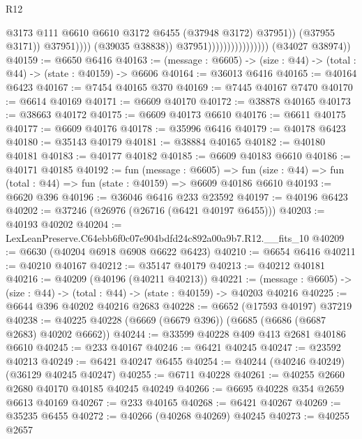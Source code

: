 \begin{lexlean}{R12}
\begin{coremodule}
                                                      @3173
                                                      @111
                                                      @6610
                                                      @6610
                                                      @3172
                                                      @6455
                                                      (@37948 @3172)
                                                      @37951))
                                                  (@37955 @3171))
                                                @37951))))
                                        (@39035 @38838))
                                      @37951))))))))))))))))
      (@34027 @38974))
@40159 := @6650 @6416
@40163 := (message : @6605) -> (size : @44) -> (total : @44) -> (state : @40159) -> @6606
@40164 := @36013 @6416
@40165 := @40164 @6423
@40167 := @7454 @40165 @370
@40169 := @7445 @40167 @7470
@40170 := @6614 @40169
@40171 := @6609 @40170
@40172 := @38878 @40165
@40173 := @38663 @40172
@40175 := @6609 @40173 @6610
@40176 := @6611 @40175
@40177 := @6609 @40176
@40178 := @35996 @6416
@40179 := @40178 @6423
@40180 := @35143 @40179
@40181 := @38884 @40165
@40182 := @40180 @40181
@40183 := @40177 @40182
@40185 := @6609 @40183 @6610
@40186 := @40171 @40185
@40192 := fun (message : @6605) =>
  fun (size : @44) => fun (total : @44) => fun (state : @40159) => @6609 @40186 @6610
@40193 := @6620 @396
@40196 := @36046 @6416 @233 @23592
@40197 := @40196 @6423
@40202 := @37246 (@26976 (@26716 (@6421 @40197 @6455)))
@40203 := @40193 @40202
@40204 := LexLeanPreserve.C64ebb6f0c07e904bdfd24c892a00a9b7.R12.__fits_10
@40209 := @6630 (@40204 @6918 @6908 @6622 @6423)
@40210 := @6654 @6416
@40211 := @40210 @40167
@40212 := @35147 @40179
@40213 := @40212 @40181
@40216 := @40209 (@40196 (@40211 @40213))
@40221 := (message : @6605) -> (size : @44) -> (total : @44) -> (state : @40159) -> @40203 @40216
@40225 := @6644 @396 @40202 @40216 @2683
@40228 := @6652 (@17593 @40197) @37219
@40238 := @40225 @40228 (@6669 (@6679 @396)) (@6685 (@6686 (@6687 @2683) @40202 @6662))
@40244 := @33599 @40228 @409 @413 @2681 @40186 @6610
@40245 := @233 @40167
@40246 := @6421 @40245
@40247 := @23592 @40213
@40249 := @6421 @40247 @6455
@40254 := @40244 (@40246 @40249) (@36129 @40245 @40247)
@40255 := @6711 @40228
@40261 := @40255 @2660 @2680 @40170 @40185 @40245 @40249
@40266 := @6695 @40228 @354 @2659 @6613 @40169
@40267 := @233 @40165
@40268 := @6421 @40267
@40269 := @35235 @6455
@40272 := @40266 (@40268 @40269) @40245
@40273 := @40255 @2657

\end{coremodule}
\end{lexlean}
